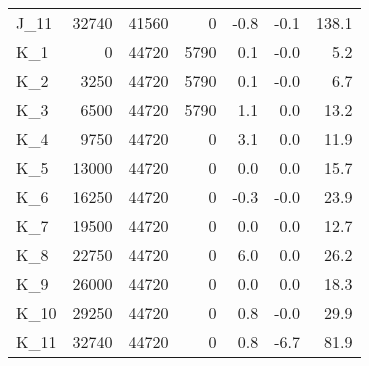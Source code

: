 \begin{tabular}{lrrrrrr}
J\_11 & 32740 & 41560 & 0 & -0.8 & -0.1 & 138.1 \\
K\_1 & 0 & 44720 & 5790 & 0.1 & -0.0 & 5.2 \\
K\_2 & 3250 & 44720 & 5790 & 0.1 & -0.0 & 6.7 \\
K\_3 & 6500 & 44720 & 5790 & 1.1 & 0.0 & 13.2 \\
K\_4 & 9750 & 44720 & 0 & 3.1 & 0.0 & 11.9 \\
K\_5 & 13000 & 44720 & 0 & 0.0 & 0.0 & 15.7 \\
K\_6 & 16250 & 44720 & 0 & -0.3 & -0.0 & 23.9 \\
K\_7 & 19500 & 44720 & 0 & 0.0 & 0.0 & 12.7 \\
K\_8 & 22750 & 44720 & 0 & 6.0 & 0.0 & 26.2 \\
K\_9 & 26000 & 44720 & 0 & 0.0 & 0.0 & 18.3 \\
K\_10 & 29250 & 44720 & 0 & 0.8 & -0.0 & 29.9 \\
K\_11 & 32740 & 44720 & 0 & 0.8 & -6.7 & 81.9 \\
\bottomrule
\end{tabular}
